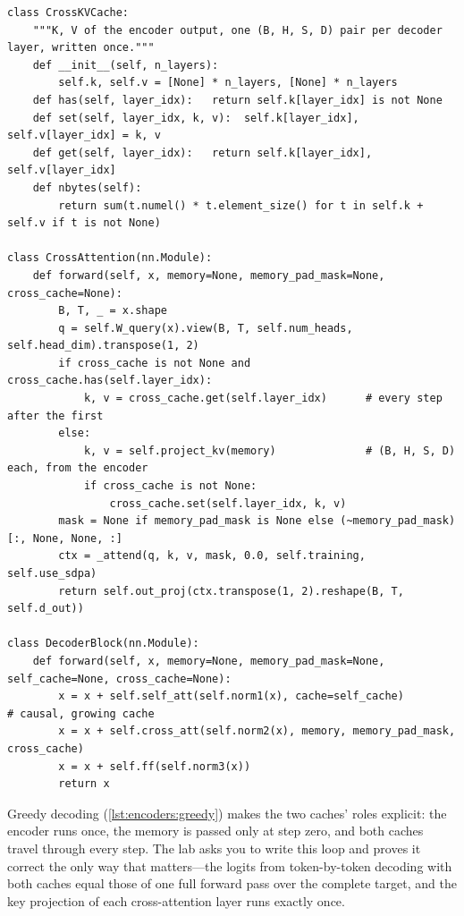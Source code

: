 \begin{lstlisting}[caption={Cross-attention with a one-shot cache (from \ident{llmsys/encdec.py}).},label={lst:encoders:cross}]
class CrossKVCache:
    """K, V of the encoder output, one (B, H, S, D) pair per decoder layer, written once."""
    def __init__(self, n_layers):
        self.k, self.v = [None] * n_layers, [None] * n_layers
    def has(self, layer_idx):   return self.k[layer_idx] is not None
    def set(self, layer_idx, k, v):  self.k[layer_idx], self.v[layer_idx] = k, v
    def get(self, layer_idx):   return self.k[layer_idx], self.v[layer_idx]
    def nbytes(self):
        return sum(t.numel() * t.element_size() for t in self.k + self.v if t is not None)

class CrossAttention(nn.Module):
    def forward(self, x, memory=None, memory_pad_mask=None, cross_cache=None):
        B, T, _ = x.shape
        q = self.W_query(x).view(B, T, self.num_heads, self.head_dim).transpose(1, 2)
        if cross_cache is not None and cross_cache.has(self.layer_idx):
            k, v = cross_cache.get(self.layer_idx)      # every step after the first
        else:
            k, v = self.project_kv(memory)              # (B, H, S, D) each, from the encoder
            if cross_cache is not None:
                cross_cache.set(self.layer_idx, k, v)
        mask = None if memory_pad_mask is None else (~memory_pad_mask)[:, None, None, :]
        ctx = _attend(q, k, v, mask, 0.0, self.training, self.use_sdpa)
        return self.out_proj(ctx.transpose(1, 2).reshape(B, T, self.d_out))

class DecoderBlock(nn.Module):
    def forward(self, x, memory=None, memory_pad_mask=None, self_cache=None, cross_cache=None):
        x = x + self.self_att(self.norm1(x), cache=self_cache)        # causal, growing cache
        x = x + self.cross_att(self.norm2(x), memory, memory_pad_mask, cross_cache)
        x = x + self.ff(self.norm3(x))
        return x
\end{lstlisting}

Greedy decoding (\cref{lst:encoders:greedy}) makes the two caches' roles explicit: the encoder runs
once, the memory is passed only at step zero, and both caches travel through every step. The lab asks
you to write this loop and proves it correct the only way that matters---the logits from
token-by-token decoding with both caches equal those of one full forward pass over the complete
target, and the key projection of each cross-attention layer runs exactly once.

